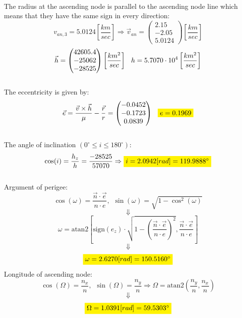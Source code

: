 \\
The radius at the ascending node is parallel to the ascending node line which means that they have the same sign in every direction:
\begin{equation}
    v_{an, 3} = 5.0124 \left[\frac{km}{sec}\right] 
    \Rightarrow
    \vec{v}_{an} = \begin{pmatrix}
        2.15\\-2.05\\5.0124
    \end{pmatrix} \left[\frac{km}{sec}\right] 
\end{equation}
\begin{equation}
    \vec{h} = \begin{pmatrix}
        42605.4 \\ -25062 \\ -28525
    \end{pmatrix}\left[\frac{km^2}{sec}\right] \hspace{0.25cm} h = 5.7070\cdot 10^4 \left[\frac{km^2}{sec}\right]
\end{equation}
\\
The eccentricity is given by:
\begin{equation}
    \vec{e} = \frac{\vec{v}\times\vec{h}}{\mu} - \frac{\vec{r}}{r} = \begin{pmatrix}
        -0.0452 \\ -0.1723 \\ 0.0839
    \end{pmatrix}
    \hspace{0.25cm} 
    \colorbox{yellow}{$e = 0.1969$}    
\end{equation}
\\
The angle of inclination $(0^\circ\leq i \leq 180^\circ)$:
\begin{equation}
    \cos (i) = \frac{h_z}{h} = \frac{-28525}{57070}
    \Rightarrow
    \colorbox{yellow}{$i = 2.0942[rad] = 119.9888^\circ$}
\end{equation}
\\
Argument of perigee:
\begin{equation}
    \cos (\omega) = \frac{\vec{n} \cdot \vec{e}}{n\cdot e},\ \  \sin (\omega) = \sqrt{1-\cos^2(\omega)}
\end{equation}
$$\Downarrow$$
\begin{equation}
    \omega = \text{atan2}\left[\text{sign}(e_z)\cdot\sqrt{1-\left(\frac{\vec{n}\cdot\vec{e}}{n\cdot e}\right)^2}, \frac{\vec{n}\cdot\vec{e}}{n\cdot e}\right]
\end{equation}
$$\Downarrow$$
\begin{align}
\colorbox{yellow}{$\omega = 2.6270 [rad] = 150.5160^\circ$}
\end{align}
Longitude of ascending node:
\begin{equation}
    \cos(\Omega) = \frac{n_x}{n},\ \ \sin(\Omega) = \frac{n_y}{n}\Rightarrow\Omega = \text{atan2}\left(\frac{n_y}{n}, \frac{n_x}{n}\right)
\end{equation}
$$\Downarrow$$
\begin{align}
\colorbox{yellow}{$\Omega = 1.0391 [rad] = 59.5303^\circ$}
\end{align}

